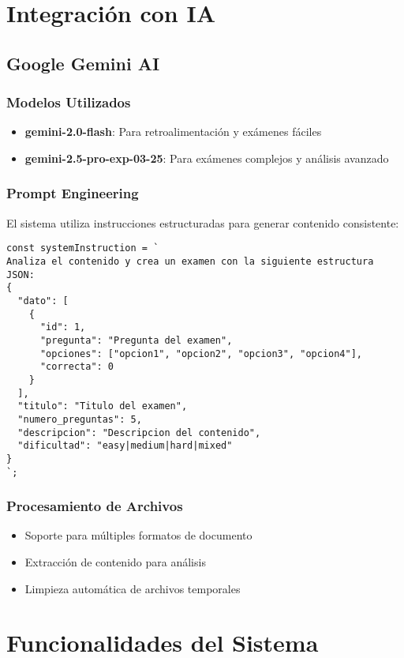 \documentclass[12pt,a4paper]{report}
\begin{document}
\chapter{Integración con IA}

\section{Google Gemini AI}

\subsection{Modelos Utilizados}
\begin{itemize}
    \item \textbf{gemini-2.0-flash}: Para retroalimentación y exámenes fáciles
    \item \textbf{gemini-2.5-pro-exp-03-25}: Para exámenes complejos y análisis avanzado
\end{itemize}

\subsection{Prompt Engineering}
El sistema utiliza instrucciones estructuradas para generar contenido consistente:

\begin{lstlisting}
const systemInstruction = `
Analiza el contenido y crea un examen con la siguiente estructura JSON:
{
  "dato": [
    {
      "id": 1,
      "pregunta": "Pregunta del examen",
      "opciones": ["opcion1", "opcion2", "opcion3", "opcion4"],
      "correcta": 0
    }
  ],
  "titulo": "Titulo del examen",
  "numero_preguntas": 5,
  "descripcion": "Descripcion del contenido",
  "dificultad": "easy|medium|hard|mixed"
}
`;
\end{lstlisting}

\subsection{Procesamiento de Archivos}
\begin{itemize}
    \item Soporte para múltiples formatos de documento
    \item Extracción de contenido para análisis
    \item Limpieza automática de archivos temporales
\end{itemize}

\chapter{Funcionalidades del Sistema}
\end{document}
